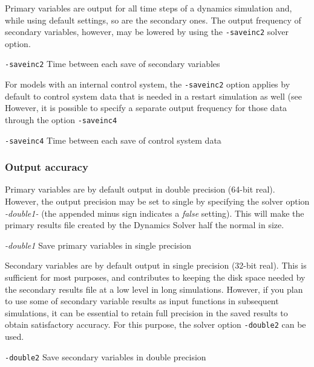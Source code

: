 {Primary variables are output for all time steps of a dynamics simulation and,
while using default settings, so are the secondary ones. The output frequency
of secondary variables, however, may be lowered by using the {\tt-saveinc2}
solver option.

{\tt-saveinc2} \hskip1cm Time between each save of secondary variables

For models with an internal control system, the {\tt-saveinc2} option applies by
default to control system data that is needed in a restart simulation as well
(see 
However, it is possible to specify a separate output frequency for those data
through the option {\tt-saveinc4}

{\tt-saveinc4} \hskip1cm Time between each save of control system data

\subsubsection{Output accuracy}

Primary variables are by default output in double precision (64-bit real).
However, the output precision may be set to single by specifying the solver
option {\sl-double1-} (the appended minus sign indicates a {\sl false} setting).
This will make the primary results file created by the Dynamics Solver half the
normal in size.

{\sl -double1} \hskip1cm Save primary variables in single precision


Secondary variables are by default output in single precision (32-bit real).
This is sufficient for most purposes, and contributes to keeping the disk space
needed by the secondary results file at a low level in long simulations.
However, if you plan to use some of secondary variable results as input
functions in subsequent simulations, it can be essential to retain full
precision in the saved results to obtain satisfactory accuracy.
For this purpose, the solver option {\tt-double2} can be used.

{\tt-double2} \hskip1cm Save secondary variables in double precision

}
